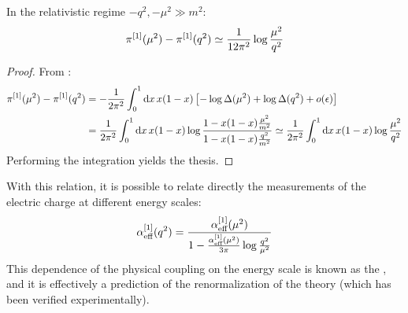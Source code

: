 \begin{lemma}{}{}
  In the relativistic regime $ - q^2 , - \mu^2 \gg m^2 $:
  \begin{equation*}
    \pi^{[1]}(\mu^2) - \pi^{[1]}(q^2) \simeq \frac{1}{12\pi^2} \log \frac{\mu^2}{q^2}
  \end{equation*}
\end{lemma}

\begin{proofbox}
  \begin{proof}
    From :
    \begin{equation*}
      \begin{split}
        \pi^{[1]}(\mu^2) - \pi^{[1]}(q^2)
        & = - \frac{1}{2\pi^2} \int_0^1 \mathrm{d} x \, x (1 - x) \left[ - \log \Delta(\mu^2) + \log \Delta(q^2) + o(\epsilon) \right] \\
        & = \frac{1}{2\pi^2} \int_0^1 \mathrm{d} x \, x (1 - x) \log \frac{1 - x (1 - x) \frac{\mu^2}{m^2}}{1 - x (1 - x) \frac{q^2}{m^2}} \simeq \frac{1}{2\pi^2} \int_0^1 \mathrm{d} x \, x (1 - x) \log \frac{\mu^2}{q^2}
      \end{split}
    \end{equation*}
    Performing the integration yields the thesis.
  \end{proof}
\end{proofbox}

With this relation, it is possible to relate directly the measurements of the electric charge at different energy scales:
\begin{equation}
  \alpha_\text{eff}^{[1]}(q^2) = \frac{\alpha_\text{eff}^{[1]}(\mu^2)}{1 - \frac{\alpha_\text{eff}^{[1]}(\mu^2)}{3\pi} \log \frac{q^2}{\mu^2}}
\end{equation}
This dependence of the physical coupling on the energy scale is known as the , and it is effectively a prediction of the renormalization of the theory (which has been verified experimentally).

